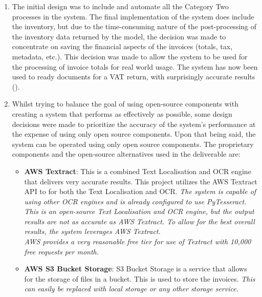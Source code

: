 \begin{enumerate}
	\item The initial design was to include and automate all the Category Two processes in the
	      system. The final implementation of the system does include the inventory, but due to the time-consuming nature of the post-processing of the
	      inventory data returned by the model, the decision was made to concentrate on saving the financial aspects
	      of the invoices (totals, tax, metadata, etc.). This decision was made to allow the system to be used for the processing of invoice totals for
	      real world usage. The system has now been used to ready documents for a VAT return, with surprisingly accurate results
	      ().
	\item Whilst trying to balance the goal of using open-source components with creating a system that performs as effectively as possible, some
	      design decisions were made to prioritize the accuracy of the system's performance at the expense of using only open source components.
	      Upon that being said, the system can be operated using only open source components.
	      The proprietary components and the open-source alternatives used in the deliverable are:
	      \begin{itemize}
		      \item \textbf{AWS Textract}: This is a combined Text Localisation and OCR engine that delivers very accurate results. This project
		            utilizes the AWS Textract API to for both the Text Localisation and OCR.
		            \bigbreak
		            \emph{The system is capable of using other OCR engines and is already configured to use PyTesseract. This is an open-source Text
			            Localisation and OCR engine, but the output results are not as accurate as AWS Textract. To allow for the best overall results,
			            the system leverages AWS Textract.\\ AWS provides a very reasonable free tier for use of Textract with 10,000 free requests per month.}
		      \item \textbf{AWS S3 Bucket Storage}: S3 Bucket Storage is a service that allows for the storage of files in a bucket. This is used to store the
		            invoices.
		            \bigbreak
		            \emph{This can easily be replaced with local storage or any other storage service.}
	      \end{itemize}
\end{enumerate}
\newpage
